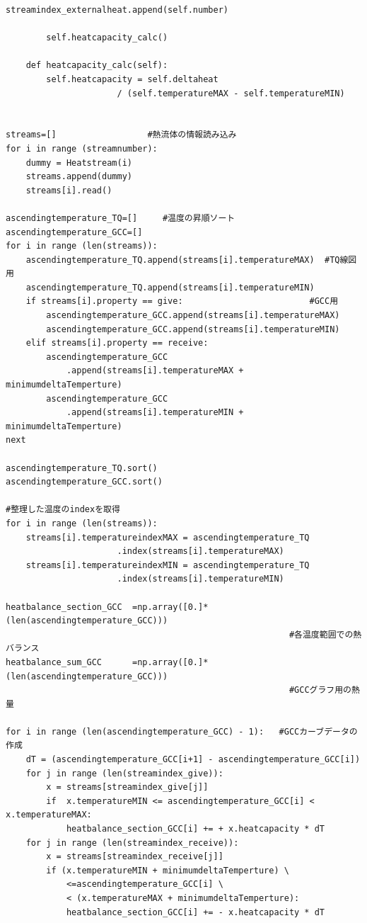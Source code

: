 \documentclass[a4j]{jsreport}
\begin{document}
\begin{lstlisting}[caption=グランドコンポジットカーブおよびTQ線図を書くコード]
            streamindex_externalheat.append(self.number)

        self.heatcapacity_calc()

    def heatcapacity_calc(self):
        self.heatcapacity = self.deltaheat
                      / (self.temperatureMAX - self.temperatureMIN)


streams=[]                  #熱流体の情報読み込み
for i in range (streamnumber):
    dummy = Heatstream(i)
    streams.append(dummy)
    streams[i].read()

ascendingtemperature_TQ=[]     #温度の昇順ソート
ascendingtemperature_GCC=[]
for i in range (len(streams)):
    ascendingtemperature_TQ.append(streams[i].temperatureMAX)  #TQ線図用
    ascendingtemperature_TQ.append(streams[i].temperatureMIN)
    if streams[i].property == give:                         #GCC用
        ascendingtemperature_GCC.append(streams[i].temperatureMAX)
        ascendingtemperature_GCC.append(streams[i].temperatureMIN)
    elif streams[i].property == receive:
        ascendingtemperature_GCC
            .append(streams[i].temperatureMAX + minimumdeltaTemperture)
        ascendingtemperature_GCC
            .append(streams[i].temperatureMIN + minimumdeltaTemperture)
next

ascendingtemperature_TQ.sort()
ascendingtemperature_GCC.sort()

#整理した温度のindexを取得
for i in range (len(streams)):
    streams[i].temperatureindexMAX = ascendingtemperature_TQ
                      .index(streams[i].temperatureMAX)
    streams[i].temperatureindexMIN = ascendingtemperature_TQ
                      .index(streams[i].temperatureMIN)

heatbalance_section_GCC  =np.array([0.]*(len(ascendingtemperature_GCC)))
                                                        #各温度範囲での熱バランス
heatbalance_sum_GCC      =np.array([0.]*(len(ascendingtemperature_GCC)))
                                                        #GCCグラフ用の熱量

for i in range (len(ascendingtemperature_GCC) - 1):   #GCCカーブデータの作成
    dT = (ascendingtemperature_GCC[i+1] - ascendingtemperature_GCC[i])
    for j in range (len(streamindex_give)):
        x = streams[streamindex_give[j]]
        if  x.temperatureMIN <= ascendingtemperature_GCC[i] < x.temperatureMAX:
            heatbalance_section_GCC[i] += + x.heatcapacity * dT
    for j in range (len(streamindex_receive)):
        x = streams[streamindex_receive[j]]
        if (x.temperatureMIN + minimumdeltaTemperture) \
            <=ascendingtemperature_GCC[i] \
            < (x.temperatureMAX + minimumdeltaTemperture):
            heatbalance_section_GCC[i] += - x.heatcapacity * dT


\end{lstlisting}
\end{document}
